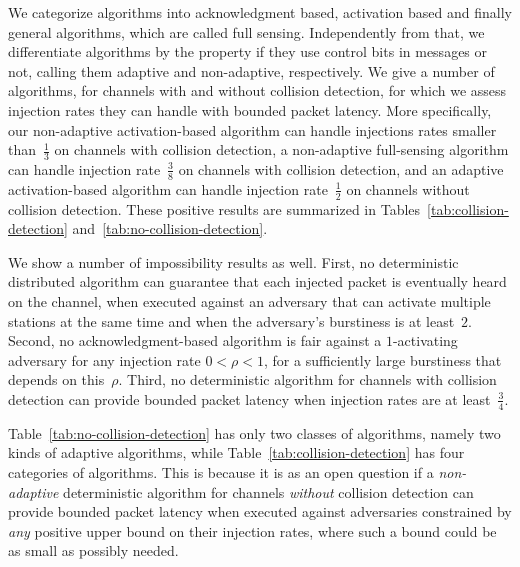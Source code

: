 \documentclass[11pt]{article}
\begin{document}
We categorize algorithms into acknowledgment based, activation based and finally general algorithms, which are called full sensing. 
Independently from that, we differentiate algorithms by the property if they use control bits in messages or not, calling them adaptive and non-adaptive,  respectively.
We give a number of algorithms, for channels with and without collision detection, for which we assess injection rates they can handle with bounded packet latency. 
More specifically, our non-adaptive  activation-based algorithm can handle injections rates smaller  than~$\frac{1}{3}$ on channels with collision detection, a  non-adaptive  full-sensing algorithm can handle injection rate~$\frac{3}{8}$ on  channels with collision detection, and an adaptive  activation-based algorithm can handle  injection rate~$\frac{1}{2}$ on channels without collision detection.
These positive results are summarized in Tables~\ref{tab:collision-detection} and~\ref{tab:no-collision-detection}.

We show a number of impossibility results as well.
First, no deterministic distributed algorithm can guarantee that each injected packet is eventually heard on the channel, when executed against an adversary that can activate multiple stations at the same time and when the adversary's burstiness is at least~$2$.
Second, no acknowledgment-based algorithm is fair against a $1$-activating adversary for any injection rate $0<\rho<1$, for a sufficiently large burstiness that depends on this~$\rho$.
Third, no deterministic algorithm for channels with collision detection  can provide bounded packet latency when injection rates are at least~$\frac{3}{4}$.

Table~\ref{tab:no-collision-detection} has only two classes of algorithms, namely two kinds of adaptive algorithms, while Table~\ref{tab:collision-detection} has four categories of algorithms.
This is because it is as an open question if a \emph{non-adaptive} deterministic algorithm for channels \emph{without} collision detection can provide bounded packet latency when executed against adversaries constrained by \emph{any} positive upper bound on their injection rates, where such a bound could  be  as small as possibly needed.
\end{document}
